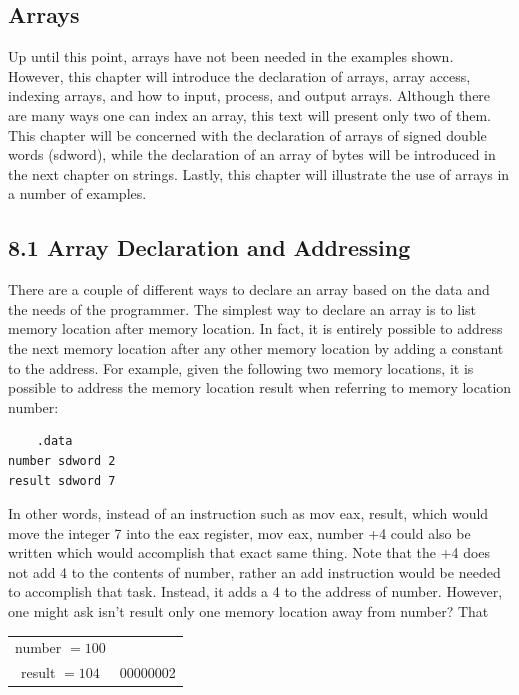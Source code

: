 \documentclass[10pt]{book}
\begin{document}
\begin{center}
\begin{center}
\section*{Arrays}
Up until this point, arrays have not been needed in the examples shown. However, this chapter will introduce the declaration of arrays, array access, indexing arrays, and how to input, process, and output arrays. Although there are many ways one can index an array, this text will present only two of them. This chapter will be concerned with the declaration of arrays of signed double words (sdword), while the declaration of an array of bytes will be introduced in the next chapter on strings. Lastly, this chapter will illustrate the use of arrays in a number of examples.

\subsection*{8.1 Array Declaration and Addressing}
There are a couple of different ways to declare an array based on the data and the needs of the programmer. The simplest way to declare an array is to list memory location after memory location. In fact, it is entirely possible to address the next memory location after any other memory location by adding a constant to the address. For example, given the following two memory locations, it is possible to address the memory location result when referring to memory location number:

\begin{verbatim}
    .data
number sdword 2
result sdword 7
\end{verbatim}

In other words, instead of an instruction such as mov eax, result, which would move the integer 7 into the eax register, mov eax, number +4 could also be written which would accomplish that exact same thing. Note that the +4 does not add 4 to the contents of number, rather an add instruction would be needed to accomplish that task. Instead, it adds a 4 to the address of number. However, one might ask isn't result only one memory location away from number? That

\begin{center}
\begin{tabular}{c|c|}
number $=100$ &  \\
result $=104$ & 00000002 \\
\hline
\end{tabular}
\end{center}


\end{center}
\end{center}
\end{document}
